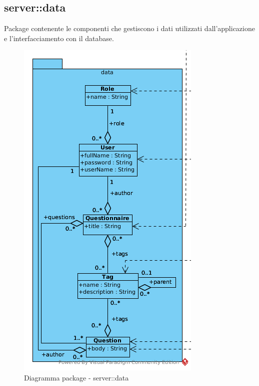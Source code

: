 \subsection{server::data}
Package contenente le componenti che gestiscono i dati utilizzati dall'applicazione e l'interfacciamento con il database.\begin{center}
		\begin{figure}[H]
			\centering \includegraphics[scale=4, max width=\textwidth, max height=\myheight]{../img/diagrammiClassi/server/data.png}
			\caption{Diagramma package - server::data}
		\end{figure}
	\end{center}\hypertarget{server::data::Tag}{}
